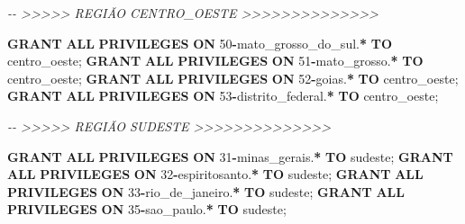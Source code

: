 \documentclass[
]{book}
\newenvironment{Shaded}{\begin{snugshade}}{\end{snugshade}}
\newcommand{\CommentTok}[1]{\textcolor[rgb]{0.56,0.35,0.01}{\textit{#1}}}
\newcommand{\DecValTok}[1]{\textcolor[rgb]{0.00,0.00,0.81}{#1}}
\newcommand{\KeywordTok}[1]{\textcolor[rgb]{0.13,0.29,0.53}{\textbf{#1}}}
\newcommand{\NormalTok}[1]{#1}
\newcommand{\OperatorTok}[1]{\textcolor[rgb]{0.81,0.36,0.00}{\textbf{#1}}}
\newcommand{\StringTok}[1]{\textcolor[rgb]{0.31,0.60,0.02}{#1}}
\begin{document}
\begin{Shaded}
\begin{Highlighting}[]
\CommentTok{{-}{-} \textgreater{}\textgreater{}\textgreater{}\textgreater{}\textgreater{} REGIÃO CENTRO\_OESTE \textgreater{}\textgreater{}\textgreater{}\textgreater{}\textgreater{}\textgreater{}\textgreater{}\textgreater{}\textgreater{}\textgreater{}\textgreater{}\textgreater{}\textgreater{}\textgreater{}}

\KeywordTok{GRANT} \KeywordTok{ALL} \KeywordTok{PRIVILEGES} \KeywordTok{ON}\NormalTok{ \textasciigrave{}}\DecValTok{50}\OperatorTok{{-}}\NormalTok{mato\_grosso\_do\_sul\textasciigrave{}.}\OperatorTok{*} \KeywordTok{TO} \StringTok{\textquotesingle{}centro\_oeste\textquotesingle{}}\NormalTok{;}
\KeywordTok{GRANT} \KeywordTok{ALL} \KeywordTok{PRIVILEGES} \KeywordTok{ON}\NormalTok{ \textasciigrave{}}\DecValTok{51}\OperatorTok{{-}}\NormalTok{mato\_grosso\textasciigrave{}.}\OperatorTok{*}       \KeywordTok{TO} \StringTok{\textquotesingle{}centro\_oeste\textquotesingle{}}\NormalTok{;}
\KeywordTok{GRANT} \KeywordTok{ALL} \KeywordTok{PRIVILEGES} \KeywordTok{ON}\NormalTok{ \textasciigrave{}}\DecValTok{52}\OperatorTok{{-}}\NormalTok{goias\textasciigrave{}.}\OperatorTok{*}             \KeywordTok{TO} \StringTok{\textquotesingle{}centro\_oeste\textquotesingle{}}\NormalTok{;}
\KeywordTok{GRANT} \KeywordTok{ALL} \KeywordTok{PRIVILEGES} \KeywordTok{ON}\NormalTok{ \textasciigrave{}}\DecValTok{53}\OperatorTok{{-}}\NormalTok{distrito\_federal\textasciigrave{}.}\OperatorTok{*}  \KeywordTok{TO} \StringTok{\textquotesingle{}centro\_oeste\textquotesingle{}}\NormalTok{;}

\CommentTok{{-}{-} \textgreater{}\textgreater{}\textgreater{}\textgreater{}\textgreater{} REGIÃO SUDESTE \textgreater{}\textgreater{}\textgreater{}\textgreater{}\textgreater{}\textgreater{}\textgreater{}\textgreater{}\textgreater{}\textgreater{}\textgreater{}\textgreater{}\textgreater{}\textgreater{}}

\KeywordTok{GRANT} \KeywordTok{ALL} \KeywordTok{PRIVILEGES} \KeywordTok{ON}\NormalTok{ \textasciigrave{}}\DecValTok{31}\OperatorTok{{-}}\NormalTok{minas\_gerais\textasciigrave{}.}\OperatorTok{*}   \KeywordTok{TO} \StringTok{\textquotesingle{}sudeste\textquotesingle{}}\NormalTok{;}
\KeywordTok{GRANT} \KeywordTok{ALL} \KeywordTok{PRIVILEGES} \KeywordTok{ON}\NormalTok{ \textasciigrave{}}\DecValTok{32}\OperatorTok{{-}}\NormalTok{espiritosanto\textasciigrave{}.}\OperatorTok{*}  \KeywordTok{TO} \StringTok{\textquotesingle{}sudeste\textquotesingle{}}\NormalTok{;}
\KeywordTok{GRANT} \KeywordTok{ALL} \KeywordTok{PRIVILEGES} \KeywordTok{ON}\NormalTok{ \textasciigrave{}}\DecValTok{33}\OperatorTok{{-}}\NormalTok{rio\_de\_janeiro\textasciigrave{}.}\OperatorTok{*} \KeywordTok{TO} \StringTok{\textquotesingle{}sudeste\textquotesingle{}}\NormalTok{;}
\KeywordTok{GRANT} \KeywordTok{ALL} \KeywordTok{PRIVILEGES} \KeywordTok{ON}\NormalTok{ \textasciigrave{}}\DecValTok{35}\OperatorTok{{-}}\NormalTok{sao\_paulo\textasciigrave{}.}\OperatorTok{*}      \KeywordTok{TO} \StringTok{\textquotesingle{}sudeste\textquotesingle{}}\NormalTok{;}


\end{Highlighting}
\end{Shaded}
\end{document}
